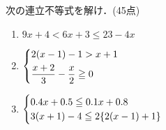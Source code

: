 次の連立不等式を解け．(45点)
\begin{enumerate}[itemsep=3ex]
  \item \(9x+4<6x+3\le 23-4x\)
  \item \(\begin{dcases}
     2(x-1)-1>x+1 \\
     \frac{x+2}{3}-\frac{x}{2}\ge 0
  \end{dcases}\)
  \item \(\begin{cases}
    0.4x+0.5\le 0.1x+0.8\\
    3(x+1)-4\le 2\cbra{2(x-1)+1}
  \end{cases}\)
\end{enumerate}
